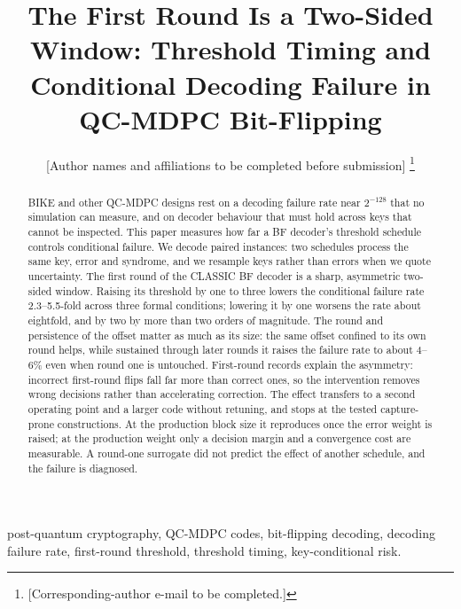 \documentclass[lettersize,journal,onecolumn]{IEEEtran}
\begin{document}
\title{The First Round Is a Two-Sided Window: Threshold Timing and
Conditional Decoding Failure in QC-MDPC Bit-Flipping}

\author{[Author names and affiliations to be completed before submission]%
\thanks{[Corresponding-author e-mail to be completed.]}}

\maketitle

\begin{abstract}

BIKE and other QC-MDPC designs rest on a decoding failure rate near $2^{-128}$ that no simulation can measure, and on decoder behaviour that must hold across keys that cannot be inspected. This paper measures how far a BF decoder's threshold schedule controls conditional failure. We decode paired instances: two schedules process the same key, error and syndrome, and we resample keys rather than errors when we quote uncertainty. The first round of the CLASSIC BF decoder is a sharp, asymmetric two-sided window. Raising its threshold by one to three lowers the conditional failure rate 2.3--5.5-fold across three formal conditions; lowering it by one worsens the rate about eightfold, and by two by more than two orders of magnitude. The round and persistence of the offset matter as much as its size: the same offset confined to its own round helps, while sustained through later rounds it raises the failure rate to about 4--6\% even when round one is untouched. First-round records explain the asymmetry: incorrect first-round flips fall far more than correct ones, so the intervention removes wrong decisions rather than accelerating correction. The effect transfers to a second operating point and a larger code without retuning, and stops at the tested capture-prone constructions. At the production block size it reproduces once the error weight is raised; at the production weight only a decision margin and a convergence cost are measurable. A round-one surrogate did not predict the effect of another schedule, and the failure is diagnosed.

\end{abstract}

\begin{IEEEkeywords}
post-quantum cryptography, QC-MDPC codes, bit-flipping decoding, decoding
failure rate, first-round threshold, threshold timing, key-conditional risk.
\end{IEEEkeywords}
\end{document}
